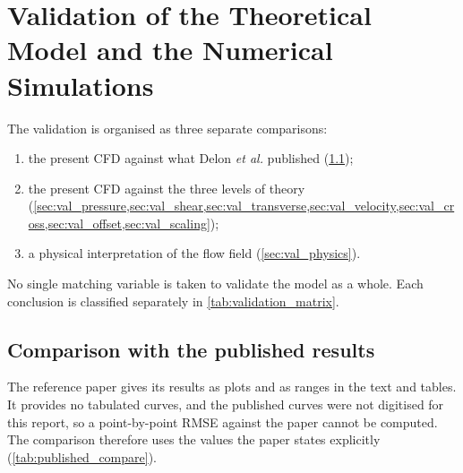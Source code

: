 \chapter{Validation of the Theoretical Model and the Numerical Simulations}
\label{ch:validation}

The validation is organised as three separate comparisons:
\begin{enumerate}
\item the present CFD against what Delon \emph{et al.} published (\cref{sec:val_published});
\item the present CFD against the three levels of theory (\cref{sec:val_pressure,sec:val_shear,sec:val_transverse,sec:val_velocity,sec:val_cross,sec:val_offset,sec:val_scaling});
\item a physical interpretation of the flow field (\cref{sec:val_physics}).
\end{enumerate}
No single matching variable is taken to validate the model as a whole. Each conclusion is classified separately in \cref{tab:validation_matrix}.

\section{Comparison with the published results}
\label{sec:val_published}

The reference paper gives its results as plots and as ranges in the text and tables. It provides no tabulated curves, and the published curves were not digitised for this report, so a point-by-point RMSE against the paper cannot be computed. The comparison therefore uses the values the paper states explicitly (\cref{tab:published_compare}).

